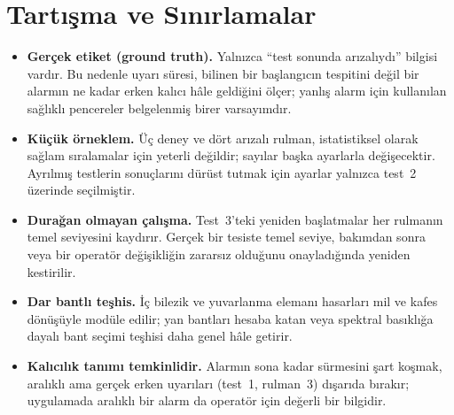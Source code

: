 \documentclass[11pt]{article}
\begin{document}
\section{Tartışma ve Sınırlamalar}
\begin{itemize}
  \item \textbf{Gerçek etiket (ground truth).} Yalnızca ``test sonunda arızalıydı'' bilgisi vardır. Bu
        nedenle uyarı süresi, bilinen bir başlangıcın tespitini değil bir alarmın ne kadar erken kalıcı
        hâle geldiğini ölçer; yanlış alarm için kullanılan sağlıklı pencereler belgelenmiş birer
        varsayımdır.
  \item \textbf{Küçük örneklem.} Üç deney ve dört arızalı rulman, istatistiksel olarak sağlam
        sıralamalar için yeterli değildir; sayılar başka ayarlarla değişecektir. Ayrılmış testlerin
        sonuçlarını dürüst tutmak için ayarlar yalnızca test~2 üzerinde seçilmiştir.
  \item \textbf{Durağan olmayan çalışma.} Test~3'teki yeniden başlatmalar her rulmanın temel seviyesini
        kaydırır. Gerçek bir tesiste temel seviye, bakımdan sonra veya bir operatör değişikliğin
        zararsız olduğunu onayladığında yeniden kestirilir.
  \item \textbf{Dar bantlı teşhis.} İç bilezik ve yuvarlanma elemanı hasarları mil ve kafes dönüşüyle
        modüle edilir; yan bantları hesaba katan veya spektral basıklığa dayalı bant seçimi teşhisi daha
        genel hâle getirir.
  \item \textbf{Kalıcılık tanımı temkinlidir.} Alarmın sona kadar sürmesini şart koşmak, aralıklı ama
        gerçek erken uyarıları (test~1, rulman~3) dışarıda bırakır; uygulamada aralıklı bir alarm da
        operatör için değerli bir bilgidir.
\end{itemize}

\end{document}
